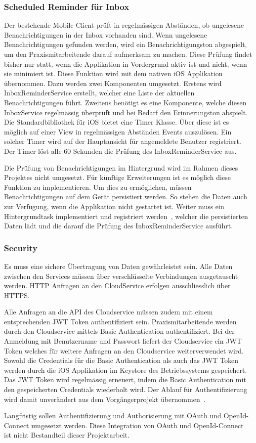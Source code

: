 \subsubsection{Scheduled Reminder für Inbox}

Der bestehende Mobile Client prüft in regelmässigen Abständen, ob ungelesene Benachrichtigungen in der Inbox vorhanden sind.
Wenn ungelesene Benachrichtigungen gefunden werden, wird ein Benachrichtigungston abgespielt, um den Praxismitarbeitende darauf aufmerksam zu machen.
Diese Prüfung findet bisher nur statt, wenn die Applikation in Vordergrund aktiv ist und nicht, wenn sie minimiert ist.
Diese Funktion wird mit dem nativen iOS Applikation übernommen.
Dazu werden zwei Komponenten umgesetzt.
Erstens wird InboxReminderService erstellt, welcher eine Liste der aktuellen Benachrichtigungen führt.
Zweitens benötigt es eine Komponente, welche diesen InboxService regelmässig überprüft und bei Bedarf den Erinnerungston abspielt.
Die Standardbibliothek für iOS bietet eine Timer Klasse.
Über diese ist es möglich auf einer View in regelmässigen Abständen Events auszulösen.\cite{ios_timer}
Ein solcher Timer wird auf der Hauptansicht für angemeldete Benutzer registriert.
Der Timer löst alle 60 Sekunden die Prüfung des InboxReminderService aus.

Die Prüfung von Benachrichtigungen im Hintergrund wird im Rahmen dieses Projektes nicht umgesetzt.
Für künftige Erweiterungen ist es möglich diese Funktion zu implementieren.
Um dies zu ermöglichen, müssen Benachrichtigungen auf dem Gerät persistiert werden.
So stehen die Daten auch zur Verfügung, wenn die Applikation nicht gestartet ist.
Weiter muss ein Hintergrundtask implementiert und registriert werden~\cite{ios_bgtaskscheduler}, welcher die persistierten Daten lädt und die darauf die Prüfung des InboxReminderService ausführt.

\subsubsection{Security}

Es muss eine sichere Übertragung von Daten gewährleistet sein.
Alle Daten zwischen den Services müssen über verschlüsselte Verbindungen ausgetauscht werden.
HTTP Anfragen an den CloudService erfolgen ausschliesslich über HTTPS.

Alle Anfragen an die API des Cloudservice müssen zudem mit einem entsprechenden JWT Token authentifiziert sein.
Praxismitarbeitende werden durch den Cloudservice mittels Basic Authentication authentifiziert.
Bei der Anmeldung mit Benutzername und Passwort liefert der Cloudservice ein JWT Token welches für weitere Anfragen an den Cloudservice weiterverwendet wird.
Sowohl die Credentials für die Basic Authentication als auch das JWT Token werden durch die iOS Applikation im Keystore des Betriebssystems gespeichert.
Das JWT Token wird regelmässig erneuert, indem die Basic Authentication mit den gespeicherten Credentials wiederholt wird.
Der Ablauf für Authentifizierung wird damit unverändert aus dem Vorgängerprojekt übernommen~\cite{ip5}.

Langfristig sollen Authentifizierung und Authorisierung mit OAuth und OpenId-Connect umgesetzt werden.
Diese Integration von OAuth und OpenId-Connect ist nicht Bestandteil dieser Projektarbeit.

\clearpage
